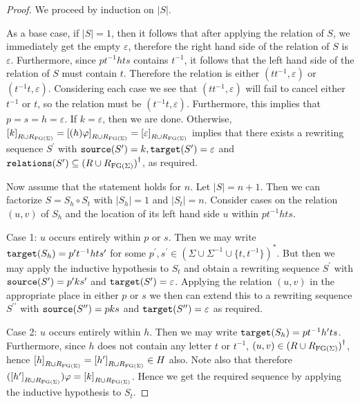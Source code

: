 \begin{proof}
  We proceed by induction on $|S|$.

  As a base case, if $|S| = 1$, then it follows that after applying the relation of $S$, we
  immediately get the empty $\varepsilon$, therefore the right hand side of the relation of $S$
  is $\varepsilon$. Furthermore, since $pt^{-1}hts$ contains $t^{-1}$, it follows that the left
  hand side of the relation of $S$ must contain $t$. Therefore the relation is either $(tt^{-1},
  \varepsilon)$ or $(t^{-1}t, \varepsilon)$. Considering each case we see that $(tt^{-1},
  \varepsilon)$ will fail to cancel either $t^{-1}$ or $t$, so the relation must be
  $(t^{-1}t,\varepsilon)$. Furthermore, this implies that $p = s = h = \varepsilon$. If $k =
  \varepsilon$, then we are done. Otherwise,
  ${[k]}_{R\cup R_{\textrm{FG}(\Sigma)}} = {[(h)\varphi]}_{R\cup R_{\textrm{FG}(\Sigma)}} = {[\varepsilon]}_{R\cup R_{\textrm{FG}(\Sigma)}}$
  implies that there exists a rewriting sequence
  $S^\prime$ with $\texttt{source}(S^\prime) = k, \texttt{target}(S^\prime) = \varepsilon$ and
  $\texttt{relations}(S^\prime) \subseteq {(R\cup R_{\textrm{FG}(\Sigma)})}^\dagger$, as required.

  Now assume that the statement holds for $n$. Let $|S| = n+1$. Then we can factorize
  $S = S_h \circ S_t$ with $|S_h| = 1$ and $|S_t| = n$.
  Consider cases on the relation $(u, v)$ of $S_h$ and the location of its left hand side $u$ within $pt^{-1}hts$.

  Case 1: $u$ occurs entirely within $p$ or $s$. Then we may write $\texttt{target}(S_h) = p^\prime
  t^{-1} h t s^\prime$ for some $p^\prime, s^\prime \in {(\Sigma\cup \Sigma^{-1}\cup \{t, t^{-1}\})}^\ast$. But then
  we may apply the inductive hypothesis to $S_t$ and obtain a rewriting sequence
  $S^\prime$ with $\texttt{source}(S^\prime) = p^\prime k s^\prime$ and $\texttt{target}(S^\prime) =
  \varepsilon$. Applying the relation $(u, v)$ in the appropriate place in either $p$ or $s$ we
  then can extend this to a rewriting sequence $S^{\prime\prime}$ with $\texttt{source}
  (S^{\prime\prime}) = pks$ and $\texttt{target}(S^{\prime\prime}) = \varepsilon$ as required.

  Case 2: $u$ occurs entirely within $h$. Then we may write
  $\texttt{target}(S_h) = pt^{-1}h^\prime ts$. Furthermore, since $h$ does not contain any letter $t$ or
  $t^{-1}$, $(u, v)\in {(R\cup R_{\textrm{FG}(\Sigma)})}^{\dagger}$, hence
  ${[h]}_{R\cup R_{\textrm{FG}(\Sigma)}} = {[h^\prime]}_{R\cup R_{\textrm{FG}(\Sigma)}} \in H$ also.
  Note also that therefore $({[h^\prime]}_{R\cup R_{\textrm{FG}(\Sigma)}})\varphi = {[k]}_{R\cup R_{\textrm{FG}(\Sigma)}}$.
  Hence we get the required sequence by applying the inductive hypothesis to $S_t$.


\end{proof}
